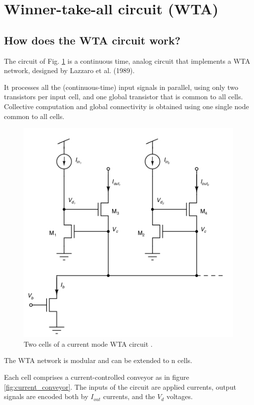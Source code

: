 \documentclass[report]{subfiles}
\begin{document}

\section{Winner-take-all circuit (WTA)}
\subsection{How does the WTA circuit work?}

The circuit of Fig. \ref{fig:WTA} is a continuous time, analog circuit that implements
a WTA network, designed by Lazzaro et al. (1989).

It processes all the (continuous-time) input signals in
parallel, using only two transistors per input cell, and one global transistor
that is common to all cells. Collective computation and global connectivity is
obtained using one single node common to all cells.

\begin{figure}[htbp]
  \centering
  \includegraphics[scale=0.8]{pics/WTA.jpg}
  \caption{Two cells of a current mode WTA circuit \cite{book:VLSI}.}
  \label{fig:WTA}
\end{figure} 

The WTA network is modular and can be extended to n cells. 

Each cell comprises a current-controlled conveyor as in figure \ref{fig:current_conveyor}. The inputs of the circuit are applied currents,
output signals are encoded both by $I_{out}$ currents, and the $V_d$ voltages. 
\end{document}
